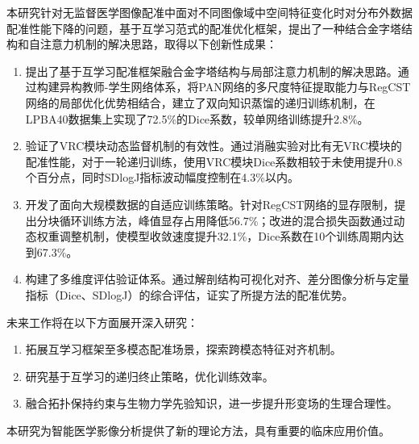\begin{conclusions}



本研究针对无监督医学图像配准中面对不同图像域中空间特征变化时对分布外数据配准性能下降的问题，基于互学习范式的配准优化框架，提出了一种结合金字塔结构和自注意力机制的解决思路，取得以下创新性成果：

\begin{enumerate}
    \item 提出了基于互学习配准框架融合金字塔结构与局部注意力机制的解决思路。通过构建异构教师-学生网络体系，将PAN网络的多尺度特征提取能力与RegCST网络的局部优化优势相结合，建立了双向知识蒸馏的递归训练机制，在LPBA40数据集上实现了72.5\%的Dice系数，较单网络训练提升2.8\%。
    \item 验证了VRC模块动态监督机制的有效性。通过消融实验对比有无VRC模块的配准性能，对于一轮递归训练，使用VRC模块Dice系数相较于未使用提升0.8个百分点，同时SDlogJ指标波动幅度控制在4.3\%以内。
    \item 开发了面向大规模数据的自适应训练策略。针对RegCST网络的显存限制，提出分块循环训练方法，峰值显存占用降低56.7\%；改进的混合损失函数通过动态权重调整机制，使模型收敛速度提升32.1\%，Dice系数在10个训练周期内达到67.3\%。
    \item 构建了多维度评估验证体系。通过解剖结构可视化对齐、差分图像分析与定量指标（Dice、SDlogJ）的综合评估，证实了所提方法的配准优势。
\end{enumerate}

未来工作将在以下方面展开深入研究：

\begin{enumerate}
    \item 拓展互学习框架至多模态配准场景，探索跨模态特征对齐机制。
    \item 研究基于互学习的递归终止策略，优化训练效率。
    \item 融合拓扑保持约束与生物力学先验知识，进一步提升形变场的生理合理性。
\end{enumerate}

本研究为智能医学影像分析提供了新的理论方法，具有重要的临床应用价值。

\end{conclusions}
